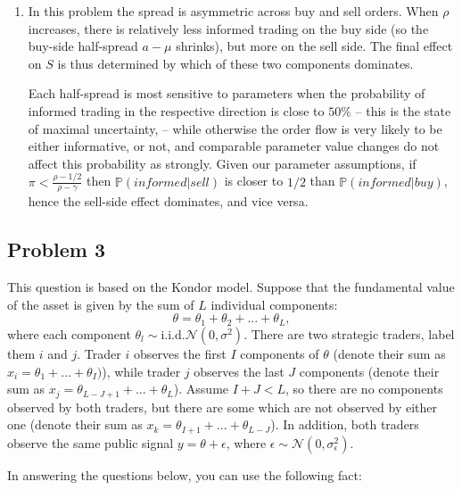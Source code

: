 \begin{solution}
\begin{enumerate}
		\item In this problem the spread is asymmetric across buy and sell orders. When $\rho$ increases, there is relatively less informed trading on the buy side (so the buy-side half-spread $a-\mu$ shrinks), but more on the sell side. The final effect on $S$ is thus determined by which of these two components dominates.
		
		Each half-spread is most sensitive to parameters when the probability of informed trading in the respective direction is close to $50\%$ -- this is the state of maximal uncertainty, -- while otherwise the order flow is very likely to be either informative, or not, and comparable parameter value changes do not affect this probability as strongly. 
		Given our parameter assumptions, if $\pi < \frac{\rho - 1/2}{\rho - \gamma}$ then $\mathbb{P}(informed|sell)$ is closer to $1/2$ than $\mathbb{P}(informed|buy)$, hence the sell-side effect dominates, and vice versa.
	\end{enumerate}
\end{solution}





\quad
\subsection*{Problem 3}

This question is based on the Kondor model.
Suppose that the fundamental value of the asset is given by the sum of $L$ individual components:
\[ \theta = \theta_1 + \theta_2 + ... + \theta_L, \]
where each component $\theta_l \sim \text{i.i.d.}\mathcal{N}(0,\sigma^2)$. There are two strategic traders, label them $i$ and $j$. Trader $i$ observes the first $I$ components of $\theta$ (denote their sum as $x_i = \theta_1 + ... + \theta_I)$), while trader $j$ observes the last $J$ components (denote their sum as $x_j = \theta_{L-J+1} + ... + \theta_L$). Assume $I + J < L$, so there are no components observed by both traders, but there are some which are not observed by either one (denote their sum as $x_k = \theta_{I+1} + ... + \theta_{L-J}$). In addition, both traders observe the same public signal $y = \theta + \epsilon$, where $\epsilon \sim \mathcal{N}(0,\sigma^2_\epsilon)$.

In answering the questions below, you can use the following fact:


